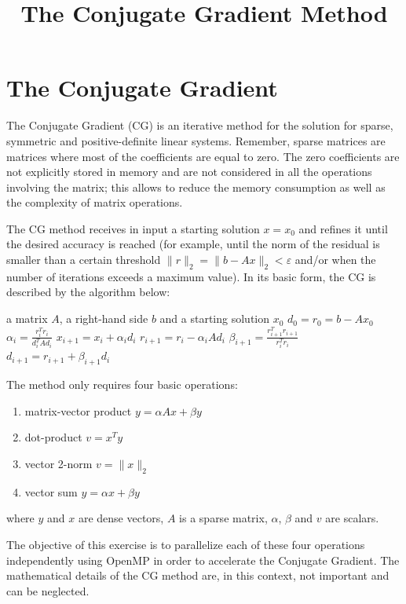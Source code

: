 \documentclass{article}
\title{The Conjugate Gradient Method}
\date{}
\begin{document}
\maketitle

\section{The Conjugate Gradient}

The Conjugate Gradient (CG) is an iterative method for the solution
for sparse, symmetric and positive-definite linear systems. Remember,
sparse matrices are matrices where most of the coefficients are equal
to zero. The zero coefficients are not explicitly stored in memory and
are not considered in all the operations involving the matrix; this
allows to reduce the memory consumption as well as the complexity of
matrix operations.

The CG method receives in input a starting solution $x=x_0$ and
refines it until the desired accuracy is reached (for example, until
the norm of the residual is smaller than a certain threshold $\|r\|_2
= \|b-Ax\|_2 < \varepsilon$ and/or when the number of iterations
exceeds a maximum value). In its basic form, the CG is described by
the algorithm below:

\begin{algorithmic}[1]
  \REQUIRE a matrix $A$, a right-hand side $b$ and a starting solution $x_0$
  \STATE $d_0 = r_0 = b-Ax_0$
  \STATE $\alpha_i = \frac{r^T_i r_i}{d^T_iAd_i}$
  \STATE $x_{i+1} = x_i + \alpha_id_i$
  \STATE $r_{i+1} = r_i - \alpha_iAd_i$
  \STATE $\beta_{i+1} = \frac{r^T_{i+1} r_{i+1}}{r^T_i r_i}$
  \STATE $d_{i+1} = r_{i+1} + \beta_{i+1}d_i$
  \ENDWHILE
\end{algorithmic}

The method only requires four basic operations:
\begin{enumerate}
\item matrix-vector product $y = \alpha Ax + \beta y$
\item dot-product $v = x^Ty$
\item vector 2-norm $v = \|x\|_2$
\item vector sum $y = \alpha x + \beta y$
\end{enumerate}
where $y$ and $x$ are dense vectors, $A$ is a sparse matrix, $\alpha$,
$\beta$ and $v$ are scalars.

The objective of this exercise is to parallelize each of these four
operations independently using OpenMP in order to accelerate the
Conjugate Gradient. The mathematical details of the CG method are, in
this context, not important and can be neglected.
\end{document}
